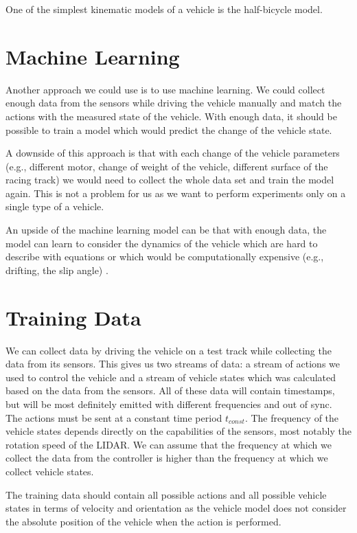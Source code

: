 One of the simplest kinematic models of a vehicle is the half-bicycle model.

\section{Machine Learning}

Another approach we could use is to use machine learning. We could collect enough data from the sensors while driving the vehicle manually and match the actions with the measured state of the vehicle. With enough data, it should be possible to train a model which would predict the change of the vehicle state.

A downside of this approach is that with each change of the vehicle parameters (e.g., different motor, change of weight of the vehicle, different surface of the racing track) we would need to collect the whole data set and train the model again. This is not a problem for us as we want to perform experiments only on a single type of a vehicle.

An upside of the machine learning model can be that with enough data, the model can learn to consider the dynamics of the vehicle which are hard to describe with equations or which would be computationally expensive (e.g., drifting, the slip angle) \cite{}.

\section{Training Data}

We can collect data by driving the vehicle on a test track while collecting the data from its sensors. This gives us two streams of data: a stream of actions we used to control the vehicle and a stream of vehicle states which was calculated based on the data from the sensors. All of these data will contain timestamps, but will be most definitely emitted with different frequencies and out of sync. The actions must be sent at a constant time period $t_{const}$. The frequency of the vehicle states depends directly on the capabilities of the sensors, most notably the rotation speed of the LIDAR. We can assume that the frequency at which we collect the data from the controller is higher than the frequency at which we collect vehicle states.

The training data should contain all possible actions and all possible vehicle states in terms of velocity and orientation as the vehicle model does not consider the absolute position of the vehicle when the action is performed.

